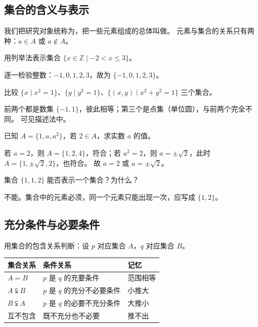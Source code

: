 \begin{explore}

\subsection{集合的含义与表示}

我们把研究对象统称为，把一些元素组成的总体叫做。
元素与集合的关系只有两种：$a\in A$ 或 $a\notin A$。

\begin{example}
用列举法表示集合 $\{x\in\mathbb{Z}\mid -2<x\le 3\}$。
\end{example}
\begin{solution}
逐一检验整数：$-1,0,1,2,3$，故为 $\{-1,0,1,2,3\}$。
\end{solution}

比较 $\{x\mid x^2=1\}$、$\{y\mid y^2=1\}$、$\{(x,y)\mid x^2+y^2=1\}$ 三个集合。
\begin{solution}
前两个都是数集 $\{-1,1\}$，彼此相等；第三个是点集（单位圆），与前两个完全不同。
可见描述法中。
\end{solution}

\begin{problem}
已知 $A=\{1,a,a^2\}$，若 $2\in A$，求实数 $a$ 的值。
\end{problem}
\begin{solution}
若 $a=2$，则 $A=\{1,2,4\}$，符合；若 $a^2=2$，则 $a=\pm\sqrt{2}$，此时 $A=\{1,\pm\sqrt{2},2\}$，也符合。
故 $a=2$ 或 $a=\pm\sqrt{2}$。
\end{solution}

\begin{problem}
集合 $\{1,1,2\}$ 能否表示一个集合？为什么？
\end{problem}
\begin{solution}
不能。集合中的元素必须，同一个元素只能出现一次，应写成 $\{1,2\}$。
\end{solution}

\subsection{充分条件与必要条件}

用集合的包含关系判断：设 $p$ 对应集合 $A$，$q$ 对应集合 $B$。
\begin{center}
\footnotesize
\setlength{\tabcolsep}{3pt}
\renewcommand{\arraystretch}{1.4}
\begin{tabular}{p{3.0cm}p{4.4cm}p{3.2cm}}
\toprule
集合关系 & 条件关系 & 记忆 \\
\midrule
$A=B$ & $p$ 是 $q$ 的充要条件 & 范围相等 \\
$A\subsetneqq B$ & $p$ 是 $q$ 的充分不必要条件 & 小推大 \\
$B\subsetneqq A$ & $p$ 是 $q$ 的必要不充分条件 & 大推小 \\
互不包含 & 既不充分也不必要 & 推不出 \\
\bottomrule
\end{tabular}
\end{center}


\end{explore}
